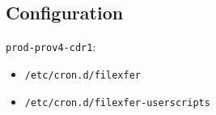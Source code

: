 

\subsection{Configuration}

\texttt{prod-prov4-cdr1}:
\begin{itemize}
    \item{\texttt{/etc/cron.d/filexfer}}
    \item{\texttt{/etc/cron.d/filexfer-userscripts}}
\end{itemize}
